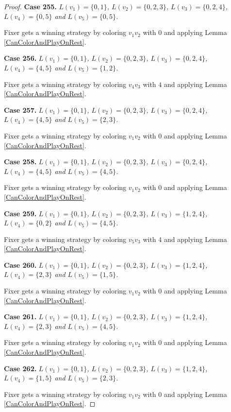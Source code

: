 \documentclass[12pt]{amsart}
\theoremstyle{plain}
\theoremstyle{definition}
\theoremstyle{remark}
\begin{document}
\begin{proof}
\noindent\textbf{Case 255.  }\textit{$L(v_1) = \{0, 1\}$, $L(v_2) = \{0, 2, 3\}$, $L(v_3) = \{0, 2, 4\}$, $L(v_4) = \{0, 5\}$ and $L(v_5) = \{0, 5\}$.}

Fixer gets a winning strategy by coloring $v_1v_2$ with $0$ and applying Lemma \ref{CanColorAndPlayOnRest}.

\noindent\textbf{Case 256.  }\textit{$L(v_1) = \{0, 1\}$, $L(v_2) = \{0, 2, 3\}$, $L(v_3) = \{0, 2, 4\}$, $L(v_4) = \{4, 5\}$ and $L(v_5) = \{1, 2\}$.}

Fixer gets a winning strategy by coloring $v_4v_3$ with $4$ and applying Lemma \ref{CanColorAndPlayOnRest}.

\noindent\textbf{Case 257.  }\textit{$L(v_1) = \{0, 1\}$, $L(v_2) = \{0, 2, 3\}$, $L(v_3) = \{0, 2, 4\}$, $L(v_4) = \{4, 5\}$ and $L(v_5) = \{2, 3\}$.}

Fixer gets a winning strategy by coloring $v_1v_2$ with $0$ and applying Lemma \ref{CanColorAndPlayOnRest}.

\noindent\textbf{Case 258.  }\textit{$L(v_1) = \{0, 1\}$, $L(v_2) = \{0, 2, 3\}$, $L(v_3) = \{0, 2, 4\}$, $L(v_4) = \{4, 5\}$ and $L(v_5) = \{4, 5\}$.}

Fixer gets a winning strategy by coloring $v_1v_2$ with $0$ and applying Lemma \ref{CanColorAndPlayOnRest}.

\noindent\textbf{Case 259.  }\textit{$L(v_1) = \{0, 1\}$, $L(v_2) = \{0, 2, 3\}$, $L(v_3) = \{1, 2, 4\}$, $L(v_4) = \{0, 2\}$ and $L(v_5) = \{4, 5\}$.}

Fixer gets a winning strategy by coloring $v_5v_3$ with $4$ and applying Lemma \ref{CanColorAndPlayOnRest}.

\noindent\textbf{Case 260.  }\textit{$L(v_1) = \{0, 1\}$, $L(v_2) = \{0, 2, 3\}$, $L(v_3) = \{1, 2, 4\}$, $L(v_4) = \{2, 3\}$ and $L(v_5) = \{1, 5\}$.}

Fixer gets a winning strategy by coloring $v_1v_2$ with $0$ and applying Lemma \ref{CanColorAndPlayOnRest}.

\noindent\textbf{Case 261.  }\textit{$L(v_1) = \{0, 1\}$, $L(v_2) = \{0, 2, 3\}$, $L(v_3) = \{1, 2, 4\}$, $L(v_4) = \{2, 3\}$ and $L(v_5) = \{4, 5\}$.}

Fixer gets a winning strategy by coloring $v_1v_2$ with $0$ and applying Lemma \ref{CanColorAndPlayOnRest}.

\noindent\textbf{Case 262.  }\textit{$L(v_1) = \{0, 1\}$, $L(v_2) = \{0, 2, 3\}$, $L(v_3) = \{1, 2, 4\}$, $L(v_4) = \{1, 5\}$ and $L(v_5) = \{2, 3\}$.}

Fixer gets a winning strategy by coloring $v_1v_2$ with $0$ and applying Lemma \ref{CanColorAndPlayOnRest}.


\end{proof}
\end{document}

